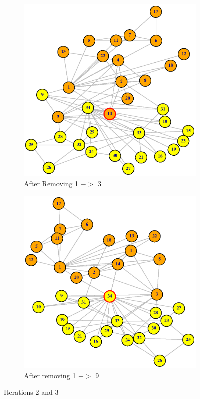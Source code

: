 \documentclass[12pt,letterpaper]{article}
\begin{document}
%
\begin{figure}
\centering
\begin{subfigure}{.5\textwidth}
  \centering
  \includegraphics[width=.9\linewidth]{Plot3}
  \caption{After Removing 1 $->$ 3 }
  \label{fig:sub1}
\end{subfigure}%
\begin{subfigure}{.5\textwidth}
  \centering
  \includegraphics[width=.9\linewidth]{Plot4}
  \caption{After removing 1 $->$ 9}
  \label{fig:sub2}
\end{subfigure}
\caption{Iterations 2 and 3}
\label{fig:test}
\end{figure}
\end{document}
